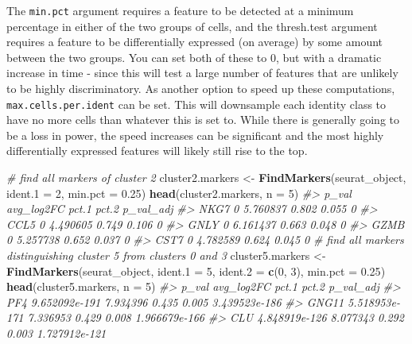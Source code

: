 \documentclass[
]{book}
\newenvironment{Shaded}{\begin{snugshade}}{\end{snugshade}}
\newcommand{\AttributeTok}[1]{\textcolor[rgb]{0.13,0.29,0.53}{#1}}
\newcommand{\CommentTok}[1]{\textcolor[rgb]{0.56,0.35,0.01}{\textit{#1}}}
\newcommand{\DecValTok}[1]{\textcolor[rgb]{0.00,0.00,0.81}{#1}}
\newcommand{\FloatTok}[1]{\textcolor[rgb]{0.00,0.00,0.81}{#1}}
\newcommand{\FunctionTok}[1]{\textcolor[rgb]{0.13,0.29,0.53}{\textbf{#1}}}
\newcommand{\NormalTok}[1]{#1}
\newcommand{\OtherTok}[1]{\textcolor[rgb]{0.56,0.35,0.01}{#1}}
\begin{document}
The \texttt{min.pct} argument requires a feature to be detected at a minimum percentage in either of the two groups of cells, and the thresh.test argument requires a feature to be differentially expressed (on average) by some amount between the two groups. You can set both of these to 0, but with a dramatic increase in time - since this will test a large number of features that are unlikely to be highly discriminatory. As another option to speed up these computations, \texttt{max.cells.per.ident} can be set. This will downsample each identity class to have no more cells than whatever this is set to. While there is generally going to be a loss in power, the speed increases can be significant and the most highly differentially expressed features will likely still rise to the top.

\begin{Shaded}
\begin{Highlighting}[]
\CommentTok{\# find all markers of cluster 2}
\NormalTok{cluster2.markers }\OtherTok{\textless{}{-}} \FunctionTok{FindMarkers}\NormalTok{(seurat\_object, }\AttributeTok{ident.1 =} \DecValTok{2}\NormalTok{, }\AttributeTok{min.pct =} \FloatTok{0.25}\NormalTok{)}
\FunctionTok{head}\NormalTok{(cluster2.markers, }\AttributeTok{n =} \DecValTok{5}\NormalTok{)}
\CommentTok{\#\textgreater{}      p\_val avg\_log2FC pct.1 pct.2 p\_val\_adj}
\CommentTok{\#\textgreater{} NKG7     0   5.760837 0.802 0.055         0}
\CommentTok{\#\textgreater{} CCL5     0   4.490605 0.749 0.106         0}
\CommentTok{\#\textgreater{} GNLY     0   6.161437 0.663 0.048         0}
\CommentTok{\#\textgreater{} GZMB     0   5.257738 0.652 0.037         0}
\CommentTok{\#\textgreater{} CST7     0   4.782589 0.624 0.045         0}
\CommentTok{\# find all markers distinguishing cluster 5 from clusters 0 and 3}
\NormalTok{cluster5.markers }\OtherTok{\textless{}{-}} \FunctionTok{FindMarkers}\NormalTok{(seurat\_object, }\AttributeTok{ident.1 =} \DecValTok{5}\NormalTok{, }\AttributeTok{ident.2 =} \FunctionTok{c}\NormalTok{(}\DecValTok{0}\NormalTok{, }\DecValTok{3}\NormalTok{), }\AttributeTok{min.pct =} \FloatTok{0.25}\NormalTok{)}
\FunctionTok{head}\NormalTok{(cluster5.markers, }\AttributeTok{n =} \DecValTok{5}\NormalTok{)}
\CommentTok{\#\textgreater{}               p\_val avg\_log2FC pct.1 pct.2     p\_val\_adj}
\CommentTok{\#\textgreater{} PF4   9.652092e{-}191   7.934396 0.435 0.005 3.439523e{-}186}
\CommentTok{\#\textgreater{} GNG11 5.518953e{-}171   7.336953 0.429 0.008 1.966679e{-}166}
\CommentTok{\#\textgreater{} CLU   4.848919e{-}126   8.077343 0.292 0.003 1.727912e{-}121}

\end{Highlighting}
\end{Shaded}
\end{document}
